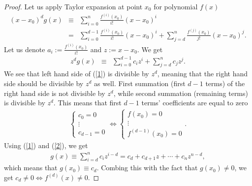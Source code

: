 \begin{proof}
    Let us apply Taylor expansion at point $x_0$ for polynomial $f(x)$ 
    \begin{eqnarray}
        (x-x_0)^dg(x)&\equiv& \sum _{i=0}^{n }{\frac {f^{(i)}(x_0)}{i!}}(x-x_0)^{i}\nonumber\\
        &=& 
        \sum _{i=0}^{d-1}{\frac {f^{(i)}(x_0)}{i!}}(x-x_0)^{i}+
        \sum _{j=d}^{n}{\frac {f^{(j)}(x_0)}{j!}}(x-x_0)^{j}.\nonumber
    \end{eqnarray}
    Let us denote $a_i:=\frac {f^{(i)}(x_0)}{i!}$ and $z:=x-x_0$. We get
    \begin{eqnarray}
        z^dg(x)&\equiv&
        \sum _{i=0}^{d-1}c_iz^{i}+
        \sum _{j=d}^{n}c_jz^{j}.\label{1}
    \end{eqnarray}
    We see that left hand side of (\ref{1}) is divisible by $z^d$, meaning that the right hand side should be divisible by $z^d$ as well. First summation (first $d-1$ terms) of the right hand side is not divisible by $z^d$, while second summation (remaining terms) is divisible by $z^d$. This means that first $d-1$ terms' coefficients are equal to zero
    \begin{eqnarray}
        \left\{ \begin{array}{c}
            c_0=0\\
            \vdots\\
            c_{d-1}=0
        \end{array}\right.
        \Leftrightarrow
        \left\{ \begin{array}{c}
            f(x_0)=0\\
            \vdots\\
            f^{({d-1})}(x_0)=0
        \end{array}\right..\label{2}
    \end{eqnarray}
    Using (\ref{1}) and (\ref{2}), we get
    \begin{eqnarray}
        g(x)\equiv \sum _{i=d}^{n}c_iz^{i-d}=c_d+c_{d+1}z+\cdots+c_nz^{n-d},\nonumber
    \end{eqnarray}
    which means that $g(x_0)\equiv c_d$. Combing this with the fact that $g(x_0)\neq 0$, we get $c_d\neq 0 \Leftrightarrow f^{(d)}(x)\neq0$.
    
\end{proof}

